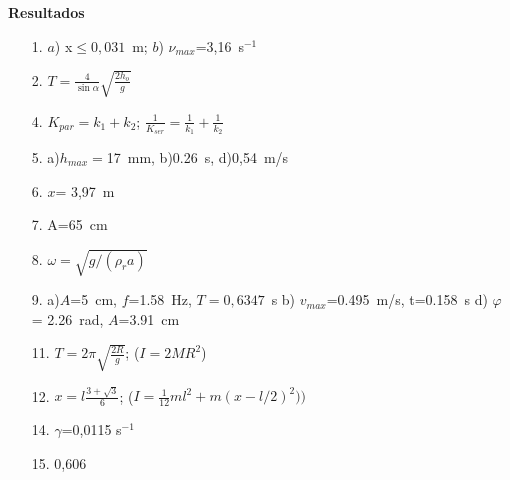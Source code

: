 \documentclass[12pt,twoside]{article}
\begin{document}
{\bf Resultados }

\begin{enumerate}
\item[1.] $a$) x$\le0,031$~m; $b$) $\nu_{max}$=3,16~s$^{-1}$
\item[2.] $T=\frac{4}{\sin\alpha}\sqrt{\frac{2h_o}{g}}$
\item[4.] $K_{par}=k_1+k_2$; $\frac{1}{K_{ser}}=\frac{1}{k_1}+\frac{1}{k_2}$
\item[5.] a)$h_{max}=$17~mm, b)0.26~s, d)0,54~m/s
\item[6.] $x$= 3,97~m
\item[7.] A=65~cm
\item[8.]  $\omega=\sqrt{g/(\rho_r a)}$
\item[9.] a)$A$=5~cm, $f$=1.58~Hz, $T=0,6347$~s b) $v_{max}$=0.495~m/s, t=0.158~s
   d) $\varphi$= 2.26~rad, $A$=3.91~cm
\item[11.] $T=2\pi\sqrt{\frac{2R}{g}}$; ($I=2MR^2$)
\item[12.] $x=l\frac{3+\sqrt{3}}{6}$; ($I=\frac{1}{12}ml^2+m(x-l/2)^2))$
\item[14.] $\gamma$=0,0115 s$^{-1}$
\item[15.] 0,606

\end{enumerate}
\end{document}

